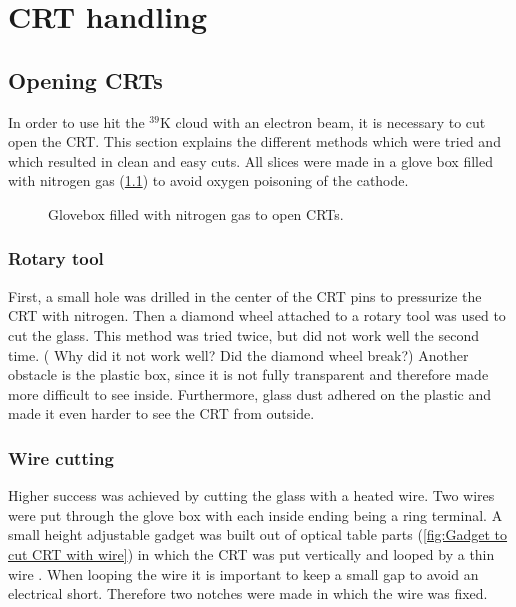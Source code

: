 
\chapter{CRT handling}
\label{chap:CRT handling}

\section{Opening CRTs}
\label{sec:Opening CRTs}

In order to use hit the $^{39}\mathrm{K}$ cloud with an electron beam, it is necessary to cut open the CRT. This section explains the different methods which were tried and which resulted in clean and easy cuts. All slices were made in a glove box filled with nitrogen gas (\cref{fig:glovebox}) to avoid oxygen poisoning of the cathode.

\begin{figure}[h]
	
	\caption{Glovebox filled with nitrogen gas to open CRTs.}
	\label{fig:glovebox}
\end{figure}


\subsection{Rotary tool}
\label{subsec:Rotary tool}


First, a small hole was drilled in the center of the CRT pins to pressurize the CRT with nitrogen. Then a diamond wheel attached to a rotary tool  was used to cut the glass. This method was tried twice, but did not work well the second time. ( Why did it not work well? Did the diamond wheel break?) Another obstacle is the plastic box, since it is not fully transparent and therefore made more difficult to see inside. Furthermore, glass dust adhered on the plastic and made it even harder to see the CRT from outside.


\subsection{Wire cutting}
\label{subsec:Wire cutting}

Higher success was achieved by cutting the glass with a heated wire. Two wires were put through the glove box with each inside ending being a ring terminal. A small height adjustable gadget was built out of optical table parts (\cref{fig:Gadget to cut CRT with wire}) in which the CRT was put vertically and looped by a thin wire . When looping the wire it is important to keep a small gap to avoid an electrical short. Therefore two notches were made in which the wire was fixed.

